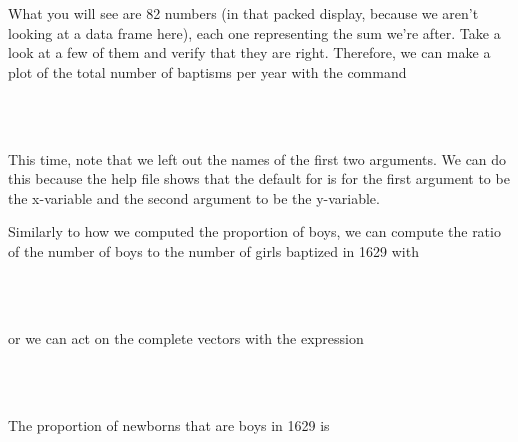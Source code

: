 \documentclass[11pt]{article}
\begin{document}
What you will see are 82 numbers (in that packed display, because we aren't looking at a data frame here), each one representing the sum we're after. Take a look at a few of them and verify that they are right. Therefore, we can make a plot of the total number of baptisms per year with the command

\ttfamily
\hlstd{}\hspace*{\fill}\\
\hlstd{}\hlkeyword{(}\hlkeyword{\usebox{\hlnormalsizeboxdollar}}\hlkeyword{,}{\ }\hlkeyword{\usebox{\hlnormalsizeboxdollar}}\hlkeyword{+}{\ }\hlkeyword{\usebox{\hlnormalsizeboxdollar}}\hlkeyword{,}{\ }\hlargument{=}{\ }\hlkeyword{)}\hspace*{\fill}\\
\normalfont

This time, note that we left out the names of the first two arguments.  We can do this because the help file shows that the default for \texttt{} is for the first argument to be the x-variable and the second argument to be the y-variable.

Similarly to how we computed the proportion of boys, we can compute the ratio of the number of boys to the number of girls baptized in 1629 with

\ttfamily
\hlstd{}\hspace*{\fill}\\
\hlstd{}\hlkeyword{/}{\ }\hspace*{\fill}\\
\normalfont

or we can act on the complete vectors with the expression

\ttfamily
\hlstd{}\hspace*{\fill}\\
\hlstd{}\hlkeyword{\usebox{\hlnormalsizeboxdollar}}\hlkeyword{/}\hlkeyword{\usebox{\hlnormalsizeboxdollar}}\hspace*{\fill}\\
\normalfont

The proportion of newborns that are boys in 1629 is

\ttfamily
\hlstd{}\hspace*{\fill}\\
\hlstd{}\hlkeyword{/}{\ }\hlkeyword{(}\hlkeyword{+}{\ }\hlkeyword{)}\hspace*{\fill}\\
\normalfont
\end{document}

